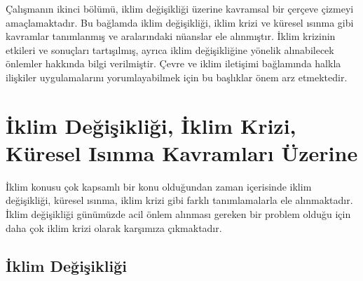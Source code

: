 \documentclass[
]{book}
\begin{document}
Çalışmanın ikinci bölümü, iklim değişikliği üzerine kavramsal bir çerçeve çizmeyi amaçlamaktadır. Bu bağlamda iklim değişikliği, iklim krizi ve küresel ısınma gibi kavramlar tanımlanmış ve aralarındaki nüanslar ele alınmıştır. İklim krizinin etkileri ve sonuçları tartışılmış, ayrıca iklim değişikliğine yönelik alınabilecek önlemler hakkında bilgi verilmiştir. Çevre ve iklim iletişimi bağlamında halkla ilişkiler uygulamalarını yorumlayabilmek için bu başlıklar önem arz etmektedir.

\hypertarget{iklim-deux11fiux15fikliux11fi-iklim-krizi-kuxfcresel-isux131nma-kavramlarux131-uxfczerine}{%
\section{İklim Değişikliği, İklim Krizi, Küresel Isınma Kavramları Üzerine}\label{iklim-deux11fiux15fikliux11fi-iklim-krizi-kuxfcresel-isux131nma-kavramlarux131-uxfczerine}}

İklim konusu çok kapsamlı bir konu olduğundan zaman içerisinde iklim değişikliği, küresel ısınma, iklim krizi gibi farklı tanımlamalarla ele alınmaktadır. İklim değişikliği günümüzde acil önlem alınması gereken bir problem olduğu için daha çok iklim krizi olarak karşımıza çıkmaktadır.

\hypertarget{iklim-deux11fiux15fikliux11fi}{%
\subsection{İklim Değişikliği}\label{iklim-deux11fiux15fikliux11fi}}
\end{document}
